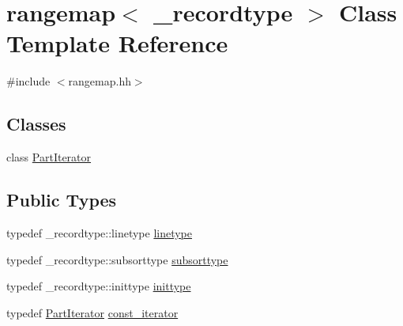 \hypertarget{classrangemap}{}\section{rangemap$<$ \+\_\+recordtype $>$ Class Template Reference}
\label{classrangemap}


{\ttfamily \#include $<$rangemap.\+hh$>$}

\subsection*{Classes}
\begin{DoxyCompactItemize}
\item 
class \mbox{\hyperlink{classrangemap_1_1_part_iterator}{Part\+Iterator}}
\end{DoxyCompactItemize}
\subsection*{Public Types}
\begin{DoxyCompactItemize}
\item 
typedef \+\_\+recordtype\+::linetype \mbox{\hyperlink{classrangemap_a54c8f7622f9af4c4232d764cf9ed11fa}{linetype}}
\item 
typedef \+\_\+recordtype\+::subsorttype \mbox{\hyperlink{classrangemap_aeef55d9063b5d89e075229fad91ea631}{subsorttype}}
\item 
typedef \+\_\+recordtype\+::inittype \mbox{\hyperlink{classrangemap_a995e3cdf45bcbbb27c59982353b2256b}{inittype}}
\item 
typedef \mbox{\hyperlink{classrangemap_1_1_part_iterator}{Part\+Iterator}} \mbox{\hyperlink{classrangemap_affa7462e68d053d3a066fe0b8d46a99d}{const\+\_\+iterator}}
\end{DoxyCompactItemize}
